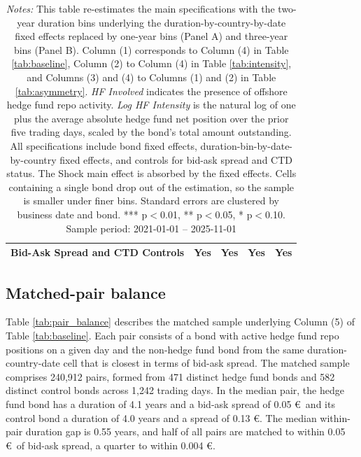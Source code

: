 \documentclass[english, 11pt, oneside]{article}
\begin{document}
\begin{table}[h!]
\begin{tabular}{l c c c c}
Bid-Ask Spread and CTD Controls & Yes & Yes & Yes & Yes \\
\bottomrule
\end{tabular}
\label{tab:bin_width}
\caption*{\textit{Notes:} This table re-estimates the main specifications with the two-year duration bins underlying the duration-by-country-by-date fixed effects replaced by one-year bins (Panel A) and three-year bins (Panel B). Column (1) corresponds to Column (4) in Table \ref{tab:baseline}, Column (2) to Column (4) in Table \ref{tab:intensity}, and Columns (3) and (4) to Columns (1) and (2) in Table \ref{tab:asymmetry}. \textit{HF Involved} indicates the presence of offshore hedge fund repo activity. \textit{Log HF Intensity} is the natural log of one plus the average absolute hedge fund net position over the prior five trading days, scaled by the bond's total amount outstanding. All specifications include bond fixed effects, duration-bin-by-date-by-country fixed effects, and controls for bid-ask spread and CTD status. The Shock main effect is absorbed by the fixed effects. Cells containing a single bond drop out of the estimation, so the sample is smaller under finer bins. Standard errors are clustered by business date and bond. *** p$<$0.01, ** p$<$0.05, * p$<$0.10. \\ Sample period: 2021-01-01 -- 2025-11-01}
\end{table}

\clearpage
\subsection{Matched-pair balance}
\label{subsec:pair_balance}

Table \ref{tab:pair_balance} describes the matched sample underlying Column (5) of Table \ref{tab:baseline}. Each pair consists of a bond with active hedge fund repo positions on a given day and the non-hedge fund bond from the same duration-country-date cell that is closest in terms of bid-ask spread. The matched sample comprises 240,912 pairs, formed from 471 distinct hedge fund bonds and 582 distinct control bonds across 1,242 trading days. In the median pair, the hedge fund bond has a duration of 4.1 years and a bid-ask spread of 0.05 \euro\ and its control bond a duration of 4.0 years and a spread of 0.13 \euro. The median within-pair duration gap is 0.55 years, and half of all pairs are matched to within 0.05 \euro\ of bid-ask spread, a quarter to within 0.004 \euro.
\end{document}
